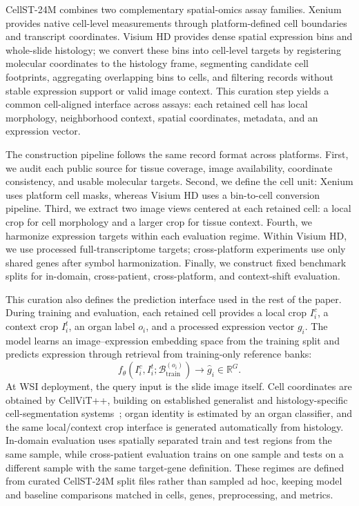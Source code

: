 \documentclass[sigconf]{acmart}
\newcommand{\dataset}{CellST-24M\xspace}
\begin{document}
\dataset{} combines two complementary spatial-omics assay families. Xenium provides native cell-level measurements through platform-defined cell boundaries and transcript coordinates. Visium HD provides dense spatial expression bins and whole-slide histology; we convert these bins into cell-level targets by registering molecular coordinates to the histology frame, segmenting candidate cell footprints, aggregating overlapping bins to cells, and filtering records without stable expression support or valid image context. This curation step yields a common cell-aligned interface across assays: each retained cell has local morphology, neighborhood context, spatial coordinates, metadata, and an expression vector.

The construction pipeline follows the same record format across platforms. First, we audit each public source for tissue coverage, image availability, coordinate consistency, and usable molecular targets. Second, we define the cell unit: Xenium uses platform cell masks, whereas Visium HD uses a bin-to-cell conversion pipeline. Third, we extract two image views centered at each retained cell: a local crop for cell morphology and a larger crop for tissue context. Fourth, we harmonize expression targets within each evaluation regime. Within Visium HD, we use processed full-transcriptome targets; cross-platform experiments use only shared genes after symbol harmonization. Finally, we construct fixed benchmark splits for in-domain, cross-patient, cross-platform, and context-shift evaluation.

This curation also defines the prediction interface used in the rest of the paper. During training and evaluation, each retained cell provides a local crop $I_i^c$, a context crop $I_i^t$, an organ label $o_i$, and a processed expression vector $g_i$. The model learns an image--expression embedding space from the training split and predicts expression through retrieval from training-only reference banks:
\begin{equation}
    f_\theta(I_i^c, I_i^t; \mathcal{B}^{(o_i)}_{\mathrm{train}})
    \rightarrow
    \hat{g}_i \in \mathbb{R}^{G}.
\end{equation}
At WSI deployment, the query input is the slide image itself. Cell coordinates are obtained by CellViT++, building on established generalist and histology-specific cell-segmentation systems~\cite{stringer2021cellpose,schmidt2018stardist,graham2019hovernet,greenwald2022mesmer,horst2024cellvit}; organ identity is estimated by an organ classifier, and the same local/context crop interface is generated automatically from histology. In-domain evaluation uses spatially separated train and test regions from the same sample, while cross-patient evaluation trains on one sample and tests on a different sample with the same target-gene definition. These regimes are defined from curated \dataset{} split files rather than sampled ad hoc, keeping model and baseline comparisons matched in cells, genes, preprocessing, and metrics.
\end{document}
